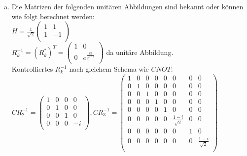\documentclass[a4paper]{scrartcl}
\begin{document}
\begin{enumerate}[a)]
\item Die Matrizen der folgenden unitären Abbildungen sind bekannt oder können wie folgt berechnet werden:\\
$H=\frac{1}{\sqrt{2}}\begin{pmatrix} 1 & 1\\ 1 & -1\\\end{pmatrix}$\\
$R_k^{-1}=(R_k^{*})^T=\begin{pmatrix} 1 & 0\\ 0 & e^{\frac{i \pi}{2^{k-1}}}\\\end{pmatrix}$ da unitäre Abbildung.\\
Kontrolliertes $R_k^{-1}$ nach gleichem Schema wie $CNOT$:\\
$CR_2^{-1}=
\begin{pmatrix} 1 & 0 & 0 & 0\\
0 & 1 & 0 & 0\\
0 & 0 & 1 & 0\\
0 & 0 & 0 & -i\\\end{pmatrix}, CR_3^{-1}=
\begin{pmatrix}
1 & 0 & 0 & 0 & 0 & 0 & 0 & 0\\
0 & 1 & 0 & 0 & 0 & 0 & 0 & 0\\
0 & 0 & 1 & 0 & 0 & 0 & 0 & 0\\
0 & 0 & 0 & 1 & 0 & 0 & 0 & 0\\
0 & 0 & 0 & 0 & 1 & 0 & 0 & 0\\
0 & 0 & 0 & 0 & 0 & \frac{1-i}{\sqrt{2}} & 0 & 0\\
0 & 0 & 0 & 0 & 0 & 0 & 1 & 0\\
0 & 0 & 0 & 0 & 0 & 0 & 0 & \frac{1-i}{\sqrt{2}}\\\end{pmatrix}$\\


\end{enumerate}
\end{document}
